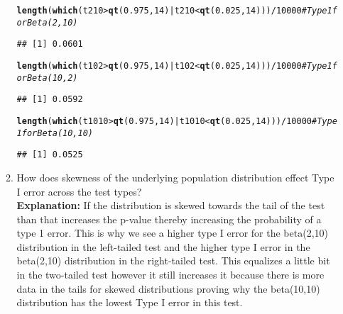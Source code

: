 \documentclass{article}\usepackage[]{graphicx}\usepackage[]{xcolor}
\makeatletter
\newcommand{\hlnum}[1]{\textcolor[rgb]{0.686,0.059,0.569}{#1}}%
\newcommand{\hlcom}[1]{\textcolor[rgb]{0.678,0.584,0.686}{\textit{#1}}}%
\newcommand{\hlopt}[1]{\textcolor[rgb]{0,0,0}{#1}}%
\newcommand{\hldef}[1]{\textcolor[rgb]{0.345,0.345,0.345}{#1}}%
\newcommand{\hlkwd}[1]{\textcolor[rgb]{0.737,0.353,0.396}{\textbf{#1}}}%
\newenvironment{kframe}{%
 \def\at@end@of@kframe{}%
 \ifinner\ifhmode%
  \def\at@end@of@kframe{\end{minipage}}%
  \begin{minipage}{\columnwidth}%
 \fi\fi%
 \def\FrameCommand##1{\hskip\@totalleftmargin \hskip-\fboxsep
 \colorbox{shadecolor}{##1}\hskip-\fboxsep
     \hskip-\linewidth \hskip-\@totalleftmargin \hskip\columnwidth}%
 \MakeFramed {\advance\hsize-\width
   \@totalleftmargin\z@ \linewidth\hsize
   \@setminipage}}%
 {\par\unskip\endMakeFramed%
 \at@end@of@kframe}
\newenvironment{knitrout}{}{} %
\makeatother
\begin{document}
\begin{enumerate}
\begin{enumerate}
\begin{knitrout}
\begin{kframe}
\begin{alltt}
\hlkwd{length}\hldef{(}\hlkwd{which}\hldef{(t210} \hlopt{>} \hlkwd{qt}\hldef{(}\hlnum{0.975}\hldef{,}\hlnum{14}\hldef{)} \hlopt{|} \hldef{t210} \hlopt{<} \hlkwd{qt}\hldef{(}\hlnum{0.025}\hldef{,}\hlnum{14}\hldef{)))}\hlopt{/}\hlnum{10000} \hlcom{#Type 1 for Beta(2,10)}
\end{alltt}
\begin{verbatim}
## [1] 0.0601
\end{verbatim}
\begin{alltt}
\hlkwd{length}\hldef{(}\hlkwd{which}\hldef{(t102} \hlopt{>} \hlkwd{qt}\hldef{(}\hlnum{0.975}\hldef{,}\hlnum{14}\hldef{)} \hlopt{|} \hldef{t102} \hlopt{<} \hlkwd{qt}\hldef{(}\hlnum{0.025}\hldef{,}\hlnum{14}\hldef{)))}\hlopt{/}\hlnum{10000} \hlcom{#Type 1 for Beta(10,2)}
\end{alltt}
\begin{verbatim}
## [1] 0.0592
\end{verbatim}
\begin{alltt}
\hlkwd{length}\hldef{(}\hlkwd{which}\hldef{(t1010} \hlopt{>} \hlkwd{qt}\hldef{(}\hlnum{0.975}\hldef{,}\hlnum{14}\hldef{)} \hlopt{|} \hldef{t1010} \hlopt{<} \hlkwd{qt}\hldef{(}\hlnum{0.025}\hldef{,}\hlnum{14}\hldef{)))}\hlopt{/}\hlnum{10000} \hlcom{#Type 1 for Beta(10,10)}
\end{alltt}
\begin{verbatim}
## [1] 0.0525
\end{verbatim}
\end{kframe}
\end{knitrout}
    \item How does skewness of the underlying population distribution effect
    Type I error across the test types?
    \\\textbf{Explanation:} If the distribution is skewed towards the tail of the test than that increases the p-value thereby increasing the probability of a type 1 error. This is why we see a higher type I error for the beta(2,10) distribution in the left-tailed test and the higher type I error in the beta(2,10) distribution in the right-tailed test. This equalizes a little bit in the two-tailed test however it still increases it because there is more data in the tails for skewed distributions proving why the beta(10,10) distribution has the lowest Type I error in this test. 
  \end{enumerate}
\end{enumerate}

\end{document}
